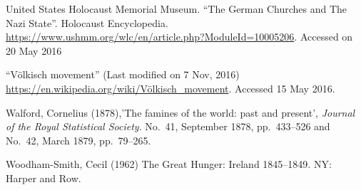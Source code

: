 \begin{thebibliography}{99}
United States Holocaust Memorial Museum. “The German Churches and The Nazi State”. Holocaust Encyclopedia. \url{https://www.ushmm.org/wlc/en/article.php?ModuleId=10005206}. Accessed on 20 May 2016

“Völkisch movement” (Last modified on 7 Nov, 2016) \url{https://en.wikipedia.org/wiki/Völkisch_movement}. Accessed 15 May 2016.	

Walford, Cornelius (1878),'The famines of the world: past and present', {\sl Journal of the Royal Statistical Society}. No.~41, September 1878, pp.~433--526 and No.~42, March 1879, pp.~79--265.

Woodham-Smith, Cecil (1962) The Great Hunger: Ireland 1845--1849. NY: Harper and Row.
\end{thebibliography}


\theendnotes
